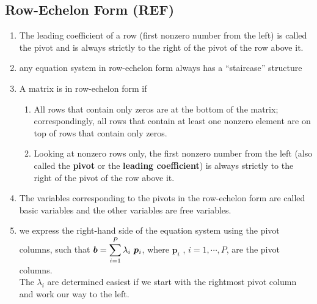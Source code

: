 \subsection{Row-Echelon Form (REF)}

\begin{enumerate}
    \item
    \begin{definition}
        The leading coefficient of a row (first nonzero number from the left) is called the pivot and is always strictly to the right of the pivot of the row above it.
        \hfill \cite{mfml/book/mml/Deisenroth-Faisal-Ong}
    \end{definition}

    \item any equation system in row-echelon form always has a “staircase” structure
    \hfill \cite{mfml/book/mml/Deisenroth-Faisal-Ong}

    \item A matrix is in row-echelon form if
    \begin{enumerate}
        \item All rows that contain only zeros are at the bottom of the matrix; correspondingly, all rows that contain at least one nonzero element are on top of rows that contain only zeros.
        \hfill \cite{mfml/book/mml/Deisenroth-Faisal-Ong}

        \item Looking at nonzero rows only, the first nonzero number from the left (also called the \textbf{pivot} or the \textbf{leading coefficient}) is always strictly to the right of the pivot of the row above it.
        \hfill \cite{mfml/book/mml/Deisenroth-Faisal-Ong}
    \end{enumerate}

    \item The variables corresponding to the pivots in the row-echelon form are called basic variables and the other variables are free variables.
    \hfill \cite{mfml/book/mml/Deisenroth-Faisal-Ong}

    \item we express the right-hand side of the equation system using the pivot columns, such that $\bm{b} = \displaystyle\sum^P_{i=1} \lambda_i\ \bm{p}_i$, where $\bm{p}_i$ , $i = 1, \cdots , P$, are the pivot columns.
    \\
    The $\lambda_i$ are determined easiest if we start with the rightmost pivot column and work our way to the left.
    \hfill \cite{mfml/book/mml/Deisenroth-Faisal-Ong}


\end{enumerate}



